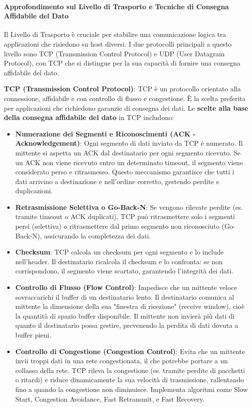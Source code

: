 \paragraph{Approfondimento sul Livello di Trasporto e Tecniche di Consegna Affidabile del Dato}
Il Livello di Trasporto è cruciale per stabilire una comunicazione logica tra applicazioni che risiedono su host diversi. I due protocolli principali a questo livello sono TCP (Transmission Control Protocol) e UDP (User Datagram Protocol), con TCP che si distingue per la sua capacità di fornire una consegna affidabile del dato.

\textbf{TCP (Transmission Control Protocol)}:
TCP è un protocollo orientato alla connessione, affidabile e con controllo di flusso e congestione. È la scelta preferita per applicazioni che richiedono garanzie di consegna dei dati.
Le \textbf{scelte alla base della consegna affidabile del dato} in TCP includono:
\begin{itemize}
    \item \textbf{Numerazione dei Segmenti e Riconoscimenti (ACK - Acknowledgement)}: Ogni segmento di dati inviato da TCP è numerato. Il mittente si aspetta un ACK dal destinatario per ogni segmento ricevuto. Se un ACK non viene ricevuto entro un determinato timeout, il segmento viene considerato perso e ritrasmesso. Questo meccanismo garantisce che tutti i dati arrivino a destinazione e nell'ordine corretto, gestendo perdite e duplicazioni.
    \item \textbf{Retrasmissione Selettiva o Go-Back-N}: Se vengono rilevate perdite (es. tramite timeout o ACK duplicati), TCP può ritrasmettere solo i segmenti persi (selettiva) o ritrasmettere dal primo segmento non riconosciuto (Go-Back-N), assicurando la completezza dei dati.
    \item \textbf{Checksum}: TCP calcola un checksum per ogni segmento e lo include nell'header. Il destinatario ricalcola il checksum e lo confronta: se non corrispondono, il segmento viene scartato, garantendo l'integrità dei dati.
    \item \textbf{Controllo di Flusso (Flow Control)}: Impedisce che un mittente veloce sovraccarichi il buffer di un destinatario lento. Il destinatario comunica al mittente la dimensione della sua "finestra di ricezione" (receive window), cioè la quantità di spazio buffer disponibile. Il mittente non invierà più dati di quanto il destinatario possa gestire, prevenendo la perdita di dati dovuta a buffer pieni.
    \item \textbf{Controllo di Congestione (Congestion Control)}: Evita che un mittente invii troppi dati in una rete congestionata, il che potrebbe portare a un collasso della rete. TCP rileva la congestione (es. tramite perdite di pacchetti o ritardi) e riduce dinamicamente la sua velocità di trasmissione, rallentando fino a quando la congestione non diminuisce. Implementa algoritmi come Slow Start, Congestion Avoidance, Fast Retransmit, e Fast Recovery.
\end{itemize}

